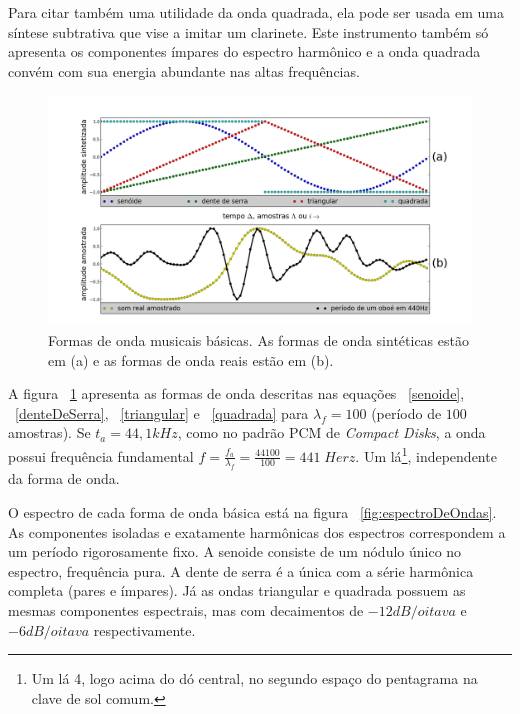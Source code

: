 Para citar também uma utilidade da onda quadrada, ela pode ser usada em uma síntese
subtrativa que vise a imitar um clarinete. Este instrumento também só apresenta os
componentes ímpares do espectro harmônico e a onda quadrada convém com sua energia abundante nas altas frequências.



\begin{figure}[h!]
    \centering
        \includegraphics[width=\textwidth]{figuras/formasDeOnda6}
    \caption{Formas de onda musicais básicas. As formas de onda sintéticas estão em (a) e as formas de onda reais estão em (b).}
        \label{fig:formasDeOnda}
\end{figure}



A figura ~\ref{fig:formasDeOnda} apresenta
as formas de onda descritas nas equações ~\ref{senoide}, ~\ref{denteDeSerra}, ~\ref{triangular} e ~\ref{quadrada} para $\lambda_f=100$ (período
de $100$ amostras).
Se $t_a=44,1 kHz$, como no padrão PCM de \emph{Compact Disks}, a onda possui frequência fundamental $f=\frac{f_a}{\lambda_f}=\frac{44100}{100} = 441 \; Herz $. Um lá\footnote{Um lá 4, logo acima do dó central, no segundo espaço do pentagrama na clave de sol comum.}, independente da forma de onda.

O espectro de cada forma de onda básica está na figura ~\ref{fig:espectroDeOndas}. As componentes isoladas e exatamente harmônicas dos espectros correspondem a um período rigorosamente fixo. A senoide consiste de um nódulo único no espectro, frequência pura. A dente de serra é a única com a série harmônica completa (pares e ímpares). Já as ondas triangular e quadrada possuem as mesmas componentes espectrais, mas com decaimentos de $-12dB/oitava$ e $-6dB/oitava$ respectivamente.

